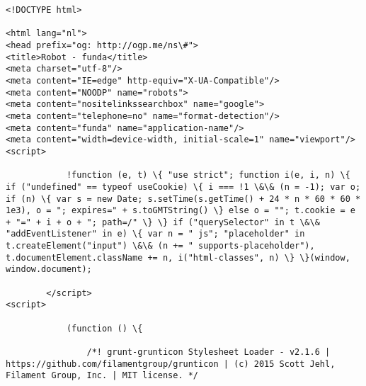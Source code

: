\documentclass[11pt]{article}
\begin{document}
    \begin{Verbatim}[commandchars=\\\{\}]
<!DOCTYPE html>

<html lang="nl">
<head prefix="og: http://ogp.me/ns\#">
<title>Robot - funda</title>
<meta charset="utf-8"/>
<meta content="IE=edge" http-equiv="X-UA-Compatible"/>
<meta content="NOODP" name="robots">
<meta content="nositelinkssearchbox" name="google">
<meta content="telephone=no" name="format-detection"/>
<meta content="funda" name="application-name"/>
<meta content="width=device-width, initial-scale=1" name="viewport"/>
<script>

            !function (e, t) \{ "use strict"; function i(e, i, n) \{ if ("undefined" == typeof useCookie) \{ i === !1 \&\& (n = -1); var o; if (n) \{ var s = new Date; s.setTime(s.getTime() + 24 * n * 60 * 60 * 1e3), o = "; expires=" + s.toGMTString() \} else o = ""; t.cookie = e + "=" + i + o + "; path=/" \} \} if ("querySelector" in t \&\& "addEventListener" in e) \{ var n = " js"; "placeholder" in t.createElement("input") \&\& (n += " supports-placeholder"), t.documentElement.className += n, i("html-classes", n) \} \}(window, window.document);

        </script>
<script>

            (function () \{

                /*! grunt-grunticon Stylesheet Loader - v2.1.6 | https://github.com/filamentgroup/grunticon | (c) 2015 Scott Jehl, Filament Group, Inc. | MIT license. */


\end{Verbatim}
\end{document}
